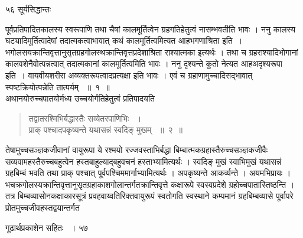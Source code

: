 \documentclass[11pt, openany]{book}
\begin{document}
\newpage

\noindent ५६ \hspace{4cm} सूर्यसिद्धान्तः
\vspace{1cm}

\begin{sloppypar}
\noindent पूर्वप्रतिपादितकालस्य स्वरूपाणि तथा चैषां कालमूर्तित्वेन ग्रहगतिहेतुत्वं नासम्भवतीति भावः । ननु कालस्य घट्यादिमूर्तित्वादेषां तदात्मकत्वाभावात् कथं कालमूर्तित्वमित्यत आह\textendash भगणाश्रिता इति~। भगोलसयक्रान्तिवृत्तानुसृतग्रहगोलस्थक्रान्तिवृत्तप्रदेशाश्रिता राश्यात्मका इत्यर्थः । तथा च ग्रहराश्यादिभोगानां कालवशेनैवोत्पन्नत्वात् तदात्मकानां कालमूर्तित्वमिति भावः । ननु दृश्यन्ते कुतो नेत्यत आह\textendash अदृश्यरूपा इति~। वायवीयशरीरा अव्यक्तरूपत्वादप्रत्यक्षा इति भावः । एवं च ग्रहाणामुच्चादिसद्भावात् स्पष्टक्रियोत्पन्नेति तात्पर्यम् ~॥~१~॥\\
\noindent अथानयोरुच्चपातयोर्मध्य उच्चयोर्गतिहेतुत्वं प्रतिपादयति\textendash
\end{sloppypar}
\begin{quote}

{\ssi तद्वातरश्मिभिर्बद्धास्तैः सव्येतरपाणिभिः ~।\\
प्राक् पश्चादपकृष्यन्ते यथासन्नं स्वदिङ् मुखम् ~॥~२~॥ }
\end{quote}
\begin{sloppypar}
तेषामुच्चसञ्ज्ञकजीवानां वायुरूपा ये रश्मयो रज्जवस्ताभिर्बद्धा बिम्बात्मकग्रहास्तैरुच्चसञ्ज्ञकजीवैः सव्यवामहस्तैरुच्चबहुत्वेन हस्तबाहुल्याद्बहुवचनं हस्ताभ्यामित्यर्थः । स्वदिङ् मुखं स्वाभिमुखं यथासन्नं ग्रहबिम्बं भवति तथा प्राक् पश्चात् पूर्वपश्चिममार्गाभ्यामित्यर्थः । अपकृष्यन्ते आकर्व्यन्ते । अयमभिप्रायः ।भचक्रगोलस्यक्रान्तिवृत्तानुसृतग्रहाकाशगोलान्तर्गतक्रान्तिवृत्ते कक्षारूपे स्वस्वप्रदेशे ग्रहोच्चपातास्तिष्ठन्ति । तत्र बिम्बव्यासोनकक्षाकारसूत्रं प्रवहवाय्वतिरिक्तवायुरूपं स्वतोगति स्वस्थाने कम्पमानं ग्रहबिम्बव्यासे पूर्वापरे प्रोतमुच्चजीवहस्तद्वयान्तर्गत\textendash
\end{sloppypar}

\newpage


\hspace{3cm} गूढार्थप्रकाशेन सहितः ~। \hfill ५७
\vspace{1cm}
\end{document}

